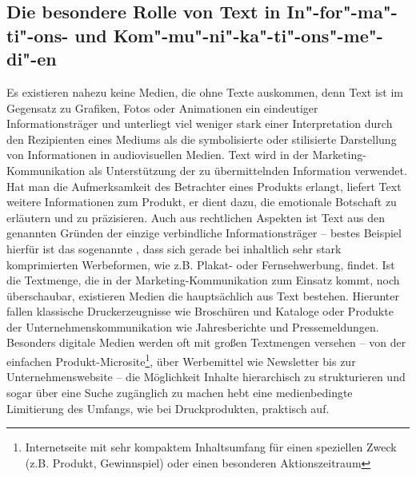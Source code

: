 \subsection{Die besondere Rolle von Text in In"-for"-ma"-ti"-ons- und Kom"-mu"-ni"-ka"-ti"-ons"-me"-di"-en}\label{l:besondererolle}

Es existieren nahezu keine Medien, die ohne Texte auskommen, denn Text ist im Gegensatz zu Grafiken, Fotos oder Animationen ein eindeutiger Informationsträger und unterliegt viel weniger stark einer Interpretation durch den Rezipienten eines Mediums als die symbolisierte oder stilisierte Darstellung von Informationen in audiovisuellen Medien. Text wird in der Marketing-Kommunikation als Unterstützung der zu übermittelnden Information verwendet. Hat man die Aufmerksamkeit des Betrachter eines Produkts erlangt, liefert Text weitere Informationen zum Produkt, er dient dazu, die emotionale Botschaft zu erläutern und zu präzisieren. Auch aus rechtlichen Aspekten ist Text aus den genannten Gründen der einzige verbindliche Informationsträger -- bestes Beispiel hierfür ist das sogenannte , dass sich gerade bei inhaltlich sehr stark komprimierten Werbeformen, wie z.B. Plakat- oder Fernsehwerbung, findet. Ist die Textmenge, die in der Marketing-Kommunikation zum Einsatz kommt, noch überschaubar, existieren Medien die hauptsächlich aus Text bestehen. Hierunter fallen klassische Druckerzeugnisse wie Broschüren und Kataloge oder Produkte der Unternehmenskommunikation wie Jahresberichte und Pressemeldungen. Besonders digitale Medien werden oft mit großen Textmengen versehen -- von der einfachen Produkt-Microsite\footnote{Internetseite mit sehr kompaktem Inhaltsumfang für einen speziellen Zweck (z.B. Produkt, Gewinnspiel) oder einen besonderen Aktionszeitraum}, über Werbemittel wie Newsletter bis zur Unternehmenswebsite -- die Möglichkeit Inhalte hierarchisch zu strukturieren und sogar über eine Suche zugänglich zu machen hebt eine medienbedingte Limitierung des Umfangs, wie bei Druckprodukten, praktisch auf.

